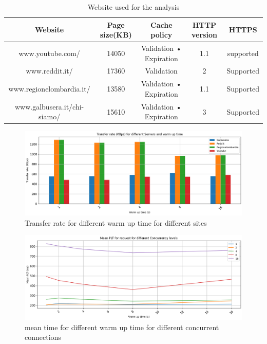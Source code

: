 \documentclass[eng]{class}
\begin{document}
\begin{table}[H]
  \tiny
  \centering
  \begin{tabular}{|c|c|c|c|c|}
    \hline
    \linewidth=0cm
    Website                     & Page size(KB) & Cache policy            & HTTP version & HTTPS     \\
    \hline
    www.youtube.com/            & 14050         & Validation • Expiration & 1.1          & supported \\
    www.reddit.it/              & 17360         & Validation              & 2            & Supported \\
    www.regionelombardia.it/    & 13580         & Validation • Expiration & 1.1          & Supported \\
    www.galbusera.it/chi-siamo/ & 15610         & Validation • Expiration & 3            & Supported \\
    \hline
  \end{tabular}
  \caption{Website used for the analysis}
  \label{tab-4}
\end{table}

\begin{figure}[H]
  \centering
  \includegraphics[width=\columnwidth]{images/transf_rate_diff_warm_up.png}
  \caption{Transfer rate for different warm up time for different sites}
  \label{fig-6}
\end{figure}

\begin{figure}[H]
  \centering
  \includegraphics[width=\columnwidth]{images/mean_time_warm_up.png}
  \caption{mean time for different warm up time for different concurrent connections}
  \label{fig-7}
\end{figure}
\end{document}
